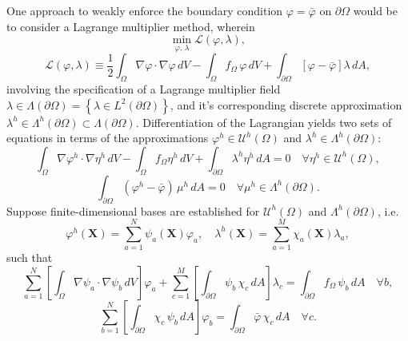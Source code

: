	One approach to weakly enforce the boundary condition $\varphi = \bar{\varphi}$ on $\partial \Omega$ would be to consider a Lagrange multiplier method, wherein
	\begin{equation}
		\min_{\varphi, \, \lambda} \mathcal{L}(\varphi,\lambda),
	\end{equation}
	\begin{equation}
	\mathcal{L}(\varphi,\lambda) \equiv \frac{1}{2} \int_{\Omega} \nabla \varphi \cdot \nabla \varphi \, dV - \int_{\Omega} f_{\Omega} \, \varphi \, dV + \int_{\partial \Omega} \left[ \varphi - \bar{\varphi} \right] \lambda \, dA,
\end{equation}
	involving the specification of a Lagrange multiplier field $\lambda \in \Lambda (\partial \Omega) = \left\{ \lambda \in L^2 (\partial \Omega) \right\}$, and it's corresponding discrete approximation $\lambda^h \in \Lambda^h (\partial \Omega) \subset \Lambda (\partial \Omega)$. Differentiation of the Lagrangian yields two sets of equations in terms of the approximations $\varphi^h \in \mathcal{U}^h (\Omega)$ and $\lambda^h \in \Lambda^h (\partial \Omega)$:
	\begin{equation}
		\int_{\Omega} \nabla \varphi^h \cdot \nabla \eta^h \, dV - \int_\Omega f_\Omega \eta^h \, dV + \int_{\partial \Omega} \lambda^h \eta^h \, dA = 0 \quad \forall \eta^h \in \mathcal{U}^h (\Omega),
	\end{equation}
	\begin{equation}
		\int_{\partial \Omega} (\varphi^h - \bar{\varphi}) \, \mu^h \, dA = 0 \quad \forall \mu^h \in \Lambda^h (\partial \Omega).
	\end{equation}
	Suppose finite-dimensional bases are established for $\mathcal{U}^h (\Omega)$ and $\Lambda^h (\partial \Omega)$, i.e.
\begin{equation}
	\varphi^h (\mathbf{X}) = \sum_{a=1}^{N} \psi_a (\mathbf{X}) \varphi_a, \quad \lambda^h (\mathbf{X}) = \sum_{a=1}^{M} \chi_a (\mathbf{X}) \lambda_a,
\end{equation}
such that
\begin{equation}
	\sum_{a=1}^N \left[ \int_{\Omega} \nabla \psi_a \cdot \nabla \psi_b \, dV \right] \varphi_a + \sum_{c=1}^M \left[ \int_{\partial \Omega} \psi_b \, \chi_c \, dA \right] \lambda_c = \int_{\partial \Omega} f_\Omega \, \psi_b \, dA \quad \forall b,
\end{equation}
\begin{equation}
	\sum_{b=1}^N \left[ \int_{\partial \Omega} \chi_c \, \psi_b \, dA \right] \varphi_b = \int_{\partial \Omega} \bar{\varphi} \, \chi_c \, dA \quad \forall c.
\end{equation}
